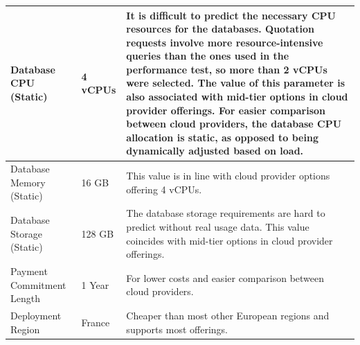 \documentclass[12pt, reqno, oneside]{amsbook}
\theoremstyle{definition}
\theoremstyle{definition}
\numberwithin{section}{chapter}
\numberwithin{table}{chapter}
\numberwithin{figure}{chapter}
\begin{document}
\begin{longtable}{|M{70pt}|M{55pt}|m{300pt}|}
  \hline
  Database CPU (Static)
   & 4 vCPUs
   & It is difficult to predict the necessary \ac{CPU} resources for the databases. Quotation requests involve more resource-intensive queries than the ones used in the performance test, so more than 2 \acp{vCPU} were selected. The value of this parameter is also associated with mid-tier options in cloud provider offerings. For easier comparison between cloud providers, the database \ac{CPU} allocation is static, as opposed to being dynamically adjusted based on load. \\
  \hline
  Database Memory (Static)
   & 16 GB
   & This value is in line with cloud provider options offering 4 \acp{vCPU}.                                                                                                                                                                                                                                                                                                                                                                                                            \\
  \hline
  Database Storage (Static)
   & 128 GB
   & The database storage requirements are hard to predict without real usage data. This value coincides with mid-tier options in cloud provider offerings.                                                                                                                                                                                                                                                                                                                              \\
  \hline
  Payment Commitment Length
   & 1 Year
   & For lower costs and easier comparison between cloud providers.                                                                                                                                                                                                                                                                                                                                                                                                                      \\
  \hline
  Deployment Region
   & France
   & Cheaper than most other European regions and supports most offerings.                                                                                                                                                                                                                                                                                                                                                                                                               \\

\end{longtable}
\end{document}
